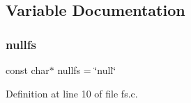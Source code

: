 \subsection{Variable Documentation}
\mbox{\label{a00149_a36265ac74fd925405e1179e799961f1e_a36265ac74fd925405e1179e799961f1e}} 
\subsubsection{\texorpdfstring{nullfs}{nullfs}}
{\footnotesize\ttfamily const char$\ast$ nullfs = \char`\"{}null\char`\"{}}



Definition at line 10 of file fs.\+c.

